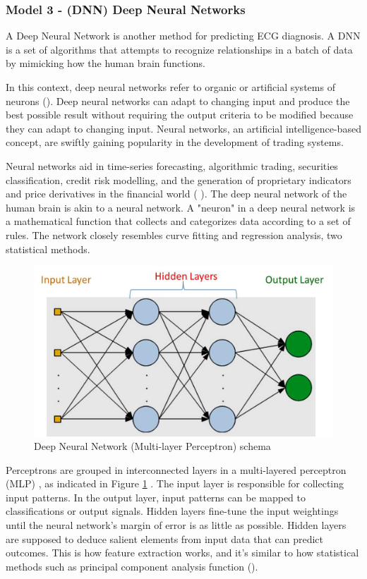 \subsubsection{Model 3 - (DNN) Deep Neural Networks} \label{3model3}

A Deep Neural Network is another method for predicting ECG diagnosis. A DNN is a set of algorithms that attempts to recognize relationships in a batch of data by mimicking how the human brain functions.

In this context, deep neural networks refer to organic or artificial systems of neurons (\cite{ann1}). Deep neural networks can adapt to changing input and produce the best possible result without requiring the output criteria to be modified because they can adapt to changing input. Neural networks, an artificial intelligence-based concept, are swiftly gaining popularity in the development of trading systems.

Neural networks aid in time-series forecasting, algorithmic trading, securities classification, credit risk modelling, and the generation of proprietary indicators and price derivatives in the financial world (\cite{ann2} \cite{ann3}). The deep neural network of the human brain is akin to a neural network. A "neuron" in a deep neural network is a mathematical function that collects and categorizes data according to a set of rules. The network closely resembles curve fitting and regression analysis, two statistical methods.

\begin{figure}[h!]
\centering
\includegraphics[scale=0.6]{img/Multilayer-Perceptron.jpg}
\caption{Deep Neural Network (Multi-layer Perceptron) schema}
\label{fig:mlp}
\end{figure}

Perceptrons are grouped in interconnected layers in a multi-layered perceptron (MLP) \cite{ann3}, as indicated in Figure \ref{fig:mlp} . The input layer is responsible for collecting input patterns. In the output layer, input patterns can be mapped to classifications or output signals. Hidden layers fine-tune the input weightings until the neural network's margin of error is as little as possible. Hidden layers are supposed to deduce salient elements from input data that can predict outcomes. This is how feature extraction works, and it's similar to how statistical methods such as principal component analysis function (\cite{ann3}).

